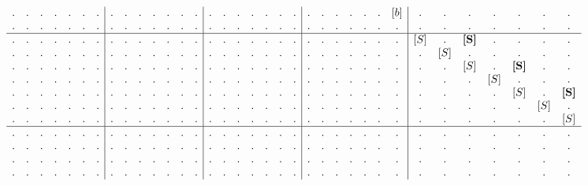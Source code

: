 \begin{example}
\begin{align}
\begin{array}{c c c c c c c | c c c c c c c | c c c c c c c | c c c c c c c | c c c c c c c}
. & . & . & . & . & . & .  &  . & . & . & . & . & . & .  &  . & . & . & . & . & . & .  &  . & . & .   & . & .   & . & [b]  &  . & . & . & . & . & . & .   \\
. & . & . & . & . & . & .  &  . & . & . & . & . & . & .  &  . & . & . & . & . & . & .  &  . & . & .   & . & .   & . & .    &  . & . & . & . & . & . & .   \\
\hline
. & . & . & . & . & . & .  &  . & . & . & . & . & . & .  &  . & . & . & . & . & . & .  &  . & . & . & . & . & . & .  &  [S] & .   & \textbf{[S]} & .   & .            & .   & .   \\
. & . & . & . & . & . & .  &  . & . & . & . & . & . & .  &  . & . & . & . & . & . & .  &  . & . & . & . & . & . & .  &  .   & [S] & .            & .   & .            & .   & .   \\
. & . & . & . & . & . & .  &  . & . & . & . & . & . & .  &  . & . & . & . & . & . & .  &  . & . & . & . & . & . & .  &  .   & .   & [S]          & .   & \textbf{[S]} & .   & .   \\
. & . & . & . & . & . & .  &  . & . & . & . & . & . & .  &  . & . & . & . & . & . & .  &  . & . & . & . & . & . & .  &  .   & .   & .            & [S] & .            & .   & .   \\
. & . & . & . & . & . & .  &  . & . & . & . & . & . & .  &  . & . & . & . & . & . & .  &  . & . & . & . & . & . & .  &  .   & .   & .            & .   & [S]          & .   & \textbf{[S]}   \\
. & . & . & . & . & . & .  &  . & . & . & . & . & . & .  &  . & . & . & . & . & . & .  &  . & . & . & . & . & . & .  &  .   & .   & .            & .   & .            & [S] & .   \\
. & . & . & . & . & . & .  &  . & . & . & . & . & . & .  &  . & . & . & . & . & . & .  &  . & . & . & . & . & . & .  &  .   & .   & .            & .   & .            & .   & [S]   \\
\hline
. & . & . & . & . & . & .  &  . & . & . & . & . & . & .  &  . & . & . & . & . & . & .  &  . & . & . & . & . & . & .  &  . & . & . & . & . & . & .   \\
. & . & . & . & . & . & .  &  . & . & . & . & . & . & .  &  . & . & . & . & . & . & .  &  . & . & . & . & . & . & .  &  . & . & . & . & . & . & .   \\
. & . & . & . & . & . & .  &  . & . & . & . & . & . & .  &  . & . & . & . & . & . & .  &  . & . & . & . & . & . & .  &  . & . & . & . & . & . & .   \\
. & . & . & . & . & . & .  &  . & . & . & . & . & . & .  &  . & . & . & . & . & . & .  &  . & . & . & . & . & . & .  &  . & . & . & . & . & . & .   \\

\end{array}
\end{align}
\end{example}
